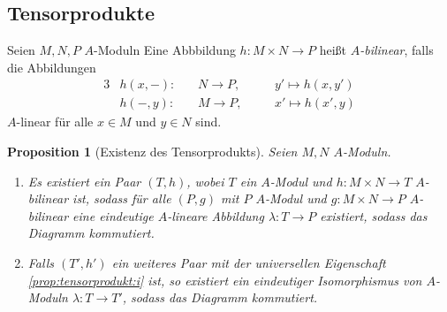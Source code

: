 \documentclass[12pt,a4paper]{scrartcl}
\theoremstyle{cplain}
\newtheorem{prop}[thmcounter]{Proposition}
\theoremstyle{cdef}
\begin{document}
\subsection{Tensorprodukte}
\begin{defi}
	Seien $M,N,P$ $A$-Moduln Eine Abbbildung $h\colon M \times N \to P$ heißt \emph{$A$-bilinear}, falls die Abbildungen
	\begin{alignat*}{3}
		&h(x,-)\colon \, &&N \to P, \quad &&y' \mapsto h(x,y') \\
		&h(-,y)\colon \, &&M \to P, \quad &&x' \mapsto h(x',y)
	\end{alignat*}
	$A$-linear für alle $x \in M$ und $y \in N$ sind.
\end{defi}
\begin{prop}[Existenz des Tensorprodukts] \label{prop:tensorprodukt}
	Seien $M,N$ $A$-Moduln.
	\begin{enumerate}
		\item Es existiert ein Paar $(T,h)$, wobei $T$ ein $A$-Modul und $h\colon M \times N \to T$ $A$-bilinear ist, sodass für alle $(P,g)$ mit $P$ $A$-Modul und $g\colon M \times N \to P$ $A$-bilinear eine eindeutige $A$-lineare Abbildung $\lambda\colon T \to P$ existiert, sodass das Diagramm  kommutiert. \label{prop:tensorprodukt:i}
		\item Falls $(T',h')$ ein weiteres Paar mit der universellen Eigenschaft \ref{prop:tensorprodukt:i} ist, so existiert ein eindeutiger Isomorphismus von $A$-Moduln $\lambda\colon T \to T'$, sodass das Diagramm  kommutiert. \label{prop:tensorprodukt:ii}
	\end{enumerate}
	\begin{figure}[H]
		\begin{subfigure}[b]{.5\linewidth}
			\centering
			\caption{}
			\label{prop:tensorprodukt:a}
		\end{subfigure}
		\begin{subfigure}[b]{.5\linewidth}
			\centering
			\caption{}
			\label{prop:tensorprodukt:b}
		\end{subfigure}
	\end{figure}
\end{prop}
\end{document}

